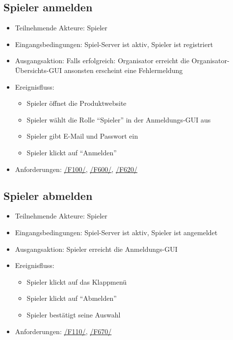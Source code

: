 \documentclass[a4paper]{scrreprt}
\begin{document}
    \subsection{Spieler anmelden}
    \begin{itemize}
        \item Teilnehmende Akteure: \Gls{Spieler}

        \item Eingangsbedingungen: \Gls{Spiel-Server} ist aktiv, \Gls{Spieler} ist registriert
        \item Ausgangsaktion: Falls erfolgreich: \Gls{Organisator} erreicht die Organisator-Übersichts-GUI ansonsten erscheint eine Fehlermeldung

        \item Ereignisfluss:
        \begin{itemize}
            \item \Gls{Spieler} öffnet die Produktwebsite
            \item \Gls{Spieler} wählt die Rolle \enquote{\Gls{Spieler}} in der Anmeldungs-GUI aus
            \item \Gls{Spieler} gibt E-Mail und Passwort ein
            \item \Gls{Spieler} klickt auf \enquote{Anmelden}
        \end{itemize}
        \item Anforderungen: \hyperlink{F100}{/F100/}, \hyperlink{F600}{/F600/}, \hyperlink{F620}{/F620/}
    \end{itemize}

    \subsection{Spieler abmelden}
    \begin{itemize}
        \item Teilnehmende Akteure: \Gls{Spieler}
        \item Eingangsbedingungen: \Gls{Spiel-Server} ist aktiv, \Gls{Spieler} ist angemeldet
        \item Ausgangsaktion: \Gls{Spieler} erreicht die Anmeldungs-GUI
        \item Ereignisfluss:
        \begin{itemize}
            \item \Gls{Spieler} klickt auf das Klappmenü
            \item \Gls{Spieler} klickt auf \enquote{Abmelden}
            \item \Gls{Spieler} bestätigt seine Auswahl
        \end{itemize}
        \item Anforderungen: \hyperlink{F110}{/F110/}, \hyperlink{F670}{/F670/}
    \end{itemize}
\end{document}
